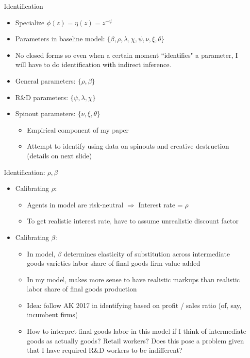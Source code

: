 \documentclass[english,usenames,dvipsnames]{beamer}
\begin{document}
\begin{frame}{Identification}
\begin{itemize}
	\item Specialize $\phi(z) = \eta(z) = z^{-\psi}$ 
	\item Parameters in baseline model: $\{\beta,\rho,\lambda,\chi,\psi,\nu,\xi,\theta\}$
	\item No closed forms so even when a certain moment ``identifies" a parameter, I will have to do identification with indirect inference. 
	\item General parameters: $\{\rho,\beta\}$
	\item R\&D parameters: $\{\psi,\lambda, \chi\}$
	\item Spinout parameters: $\{ \nu,\xi,\theta \}$
	\begin{itemize}
		\item Empirical component of my paper
		\item Attempt to identify using data on spinouts and creative destruction (details on next slide)
	\end{itemize}
\end{itemize}
\end{frame}

\begin{frame}{Identification: $\rho, \beta$}
\begin{itemize}
	\item Calibrating $\rho$:
	\begin{itemize}
		\item Agents in model are risk-neutral $\Rightarrow$ Interest rate = $\rho$
		\item To get realistic interest rate, have to assume unrealistic discount factor
	\end{itemize}
	\item Calibrating $\beta$:
	\begin{itemize}
		\item In model, $\beta$ determines elasticity of substitution across intermediate goods varieties labor share of final goods firm value-added
		\item In my model, makes more sense to have realistic markups than realistic labor share of final goods production
		\item Idea: follow AK 2017 in identifying based on profit / sales ratio (of, say, incumbent firms)
		\item How to interpret final goods labor in this model if I think of intermediate goods as actually goods? Retail workers? Does this pose a problem given that I have required R\&D workers to be indifferent? 
	\end{itemize}
\end{itemize}
\end{frame}
\end{document}
